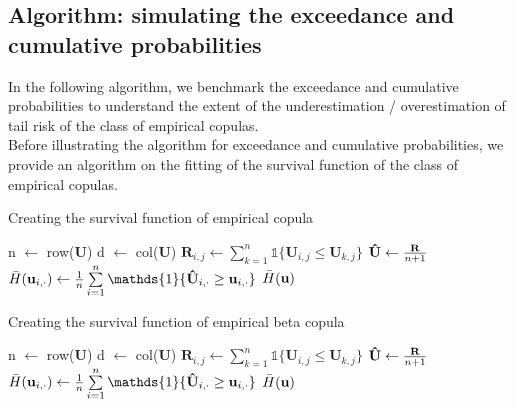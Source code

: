 \documentclass[12pt]{report}
\newcommand{\1}{\mathbf{1}}
\begin{document}
\begin{flushleft}
\subsection{Algorithm: simulating the exceedance and cumulative probabilities}
\vspace{0.5cm}
In the following algorithm, we benchmark the exceedance and cumulative probabilities to understand the extent of the underestimation / overestimation of tail risk of the class of empirical copulas. \\
\vspace{0.5cm}
Before illustrating the algorithm for exceedance and cumulative probabilities, we provide an algorithm on the fitting of the survival function of the class of empirical copulas.\\
\begin{algorithm}
\caption{Creating the survival function of empirical copula}
\begin{algorithmic}
    \State n $\gets$ row($\mathbf{U}$)
    \State d $\gets$ col($\mathbf{U}$)
            \State $\textbf{R}_{i,j} \gets \sum\limits_{k = 1}^{n} \mathds{1} \{ \textbf{U}_{i,j} \le \textbf{U}_{k,j} \}$
        \EndFor
    \EndFor
    \State $\mathbf{\Hat{U}} \gets \frac{\mathbf{R}}{n + 1}$ 
        \State $ \Bar{H}(\textbf{u}_{i,\cdot}) \gets \frac{1}{n} \sum\limits_{i = 1}^{n} \mathds{1}\{\mathbf{\Hat{U}}_{i,\cdot} \ge \mathbf{u}_{i,\cdot}\}$ 
    \EndFor
    \State \Return $\Bar{H}(\textbf{u})$
\EndProcedure
\end{algorithmic}
\end{algorithm}

\begin{algorithm}
\caption{Creating the survival function of empirical beta copula}
\begin{algorithmic}
    \State n $\gets$ row($\mathbf{U}$)
    \State d $\gets$ col($\mathbf{U}$)
            \State $\textbf{R}_{i,j} \gets \sum\limits_{k = 1}^{n} \mathds{1} \{ \textbf{U}_{i,j} \le \textbf{U}_{k,j} \}$
        \EndFor
    \EndFor
    \State $\mathbf{\Hat{U}} \gets \frac{\mathbf{R}}{n + 1}$ 
        \State $ \Bar{H}(\textbf{u}_{i,\cdot}) \gets \frac{1}{n} \sum\limits_{i = 1}^{n} \mathds{1}\{\mathbf{\Hat{U}}_{i,\cdot} \ge \mathbf{u}_{i,\cdot}\}$ 
    \EndFor
    \State \Return $\Bar{H}(\textbf{u})$
\EndProcedure
\end{algorithmic}
\end{algorithm}


\end{flushleft}
\end{document}
